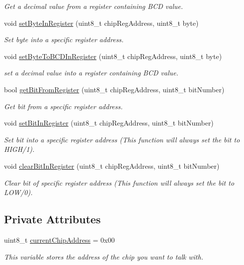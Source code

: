 \begin{DoxyCompactItemize}
\begin{DoxyCompactList}\small\item\em Get a decimal value from a register containing B\+CD value. \end{DoxyCompactList}\item 
void \mbox{\hyperlink{classi2c_bus_a8bed9bf37dee74b691ab4c92723dd206}{set\+Byte\+In\+Register}} (uint8\+\_\+t chip\+Reg\+Address, uint8\+\_\+t byte)
\begin{DoxyCompactList}\small\item\em Set byte into a specific register address. \end{DoxyCompactList}\item 
void \mbox{\hyperlink{classi2c_bus_a31c36069cff15f73aa54703a6ee8b951}{set\+Byte\+To\+B\+C\+D\+In\+Register}} (uint8\+\_\+t chip\+Reg\+Address, uint8\+\_\+t byte)
\begin{DoxyCompactList}\small\item\em set a decimal value into a register containing B\+CD value. \end{DoxyCompactList}\item 
bool \mbox{\hyperlink{classi2c_bus_aeedd7fa6ab6640fe86bcfb8a3ac3f306}{get\+Bit\+From\+Register}} (uint8\+\_\+t chip\+Reg\+Address, uint8\+\_\+t bit\+Number)
\begin{DoxyCompactList}\small\item\em Get bit from a specific register address. \end{DoxyCompactList}\item 
void \mbox{\hyperlink{classi2c_bus_a3b2f595372a05bde8e1cf9d6a86f2bdb}{set\+Bit\+In\+Register}} (uint8\+\_\+t chip\+Reg\+Address, uint8\+\_\+t bit\+Number)
\begin{DoxyCompactList}\small\item\em Set bit into a specific register address (This function will always set the bit to H\+I\+G\+H/1). \end{DoxyCompactList}\item 
void \mbox{\hyperlink{classi2c_bus_a30c140f08712618bc46f7c98ba1da3c3}{clear\+Bit\+In\+Register}} (uint8\+\_\+t chip\+Reg\+Address, uint8\+\_\+t bit\+Number)
\begin{DoxyCompactList}\small\item\em Clear bit of specific register address (This function will always set the bit to L\+O\+W/0). \end{DoxyCompactList}\end{DoxyCompactItemize}
\subsection*{Private Attributes}
\begin{DoxyCompactItemize}
\item 
uint8\+\_\+t \mbox{\hyperlink{classi2c_bus_a64ff87527c88619d72ede947d73eac3a}{current\+Chip\+Address}} = 0x00
\begin{DoxyCompactList}\small\item\em This variable stores the address of the chip you want to talk with. \end{DoxyCompactList}\end{DoxyCompactItemize}



